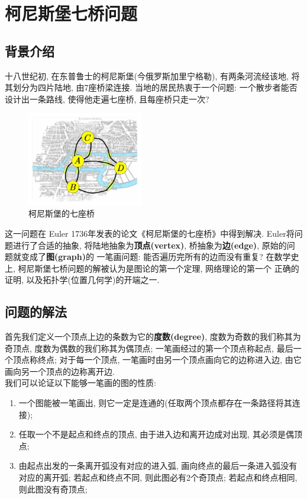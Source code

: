 \documentclass[main]{subfiles}
\begin{document}
\renewcommand{\filename}{subfile18}%
\section{柯尼斯堡七桥问题}
\subsection{背景介绍}
十八世纪初, 在东普鲁士的柯尼斯堡(今俄罗斯加里宁格勒), 有两条河流经该地, 将其划分为四片陆地, 由7座桥梁连接. 
当地的居民热衷于一个问题: 一个散步者能否设计出一条路线, 使得他走遍七座桥, 且每座桥只走一次? 
\begin{figure}[h]
 
  \centering
      \includegraphics[width=0.45\textwidth]{Konigsberg_bridges.pdf}
      \caption{柯尼斯堡的七座桥}
\end{figure}

这一问题在 Euler 1736年发表的论文《柯尼斯堡的七座桥》中得到解决. 
Euler将问题进行了合适的抽象, 将陆地抽象为\textbf{顶点(vertex)}, 桥抽象为\textbf{边(edge)}, 原始的问题就变成了\textbf{图(graph)}的
一笔画问题: 能否遍历完所有的边而没有重复? 在数学史上, 柯尼斯堡七桥问题的解被认为是图论的第一个定理, 网络理论的第一个
正确的证明, 以及拓扑学(位置几何学)的开端之一.

\subsection{问题的解法}
首先我们定义一个顶点上边的条数为它的\textbf{度数(degree)}, 度数为奇数的我们称其为奇顶点, 度数为偶数的我们称其为偶顶点; 一笔画经过的第一个顶点称起点, 最后一个顶点称终点; 
对于每一个顶点, 一笔画时由另一个顶点画向它的边称进入边, 由它画向另一个顶点的边称离开边. \\
我们可以论证以下能够一笔画的图的性质: 
\begin{enumerate}
  \item 一个图能被一笔画出, 则它一定是连通的(任取两个顶点都存在一条路径将其连接);
  \item 任取一个不是起点和终点的顶点, 由于进入边和离开边成对出现, 其必须是偶顶点;
  \item 由起点出发的一条离开弧没有对应的进入弧, 画向终点的最后一条进入弧没有对应的离开弧; 若起点和终点不同, 则此图必有2个奇顶点; 若起点和终点相同, 则此图没有奇顶点;
\end{enumerate}
\end{document}
